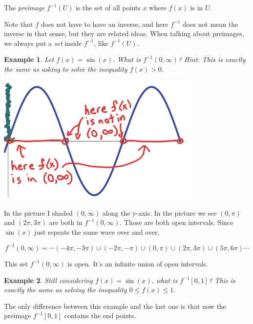 \documentclass[11pt]{book}
\newenvironment{definition}[1][Definition]{\begin{trivlist}
\item[\hskip \labelsep {\bfseries #1}]}{\end{trivlist}}
\newtheorem{example}{Example}
\numberwithin{example}{chapter}
\begin{document}
\begin{definition}
The \emph{preimage} $f^{-1}(U)$ is the set of all points $x$ where $f(x)$ is in $U$.
\end{definition}


Note that $f$ does not have to have an inverse, and here $f^{-1}$ does not mean the inverse in that sense, but they are related ideas.  When talking about preimages, we always put a \emph{set} inside $f^{-1}$, like $f^{-1}(U)$.

\begin{example}
Let $f(x)=\sin(x)$.  What is $f^{-1}(0,\infty)$?  Hint: This is exactly the same as asking to solve the inequality $f(x) >0$.
\end{example}


\begin{center}
\includegraphics[width=4in]{toplec1_3.png}
\end{center}


In the picture I shaded $(0,\infty)$ along the y-axis.  In the picture we see $(0,\pi)$ and $(2\pi,3\pi)$ are both in $f^{-1}(0,\infty)$.  Those are both open intervals.  Since $\sin(x)$ just repeats the same wave over and over, 

$$f^{-1}(0,\infty) = \cdots (-4\pi,-3\pi)\cup (-2\pi,-\pi) \cup  (0,\pi) \cup  (2\pi,3\pi) \cup  (5\pi,6\pi) \cdots $$

This set $f^{-1}(0,\infty)$ is open.  It's an infinite union of open intervals.  


\begin{example}
Still considering $f(x)=\sin(x)$, what is $f^{-1}[0,1]$?  This is exactly the same as solving the inequality $0\leq f(x) \leq 1$.  
\end{example}

The only difference between this example and the last one is that now the preimage $f^{-1}[0,1]$ contains the end points.  
\end{document}

